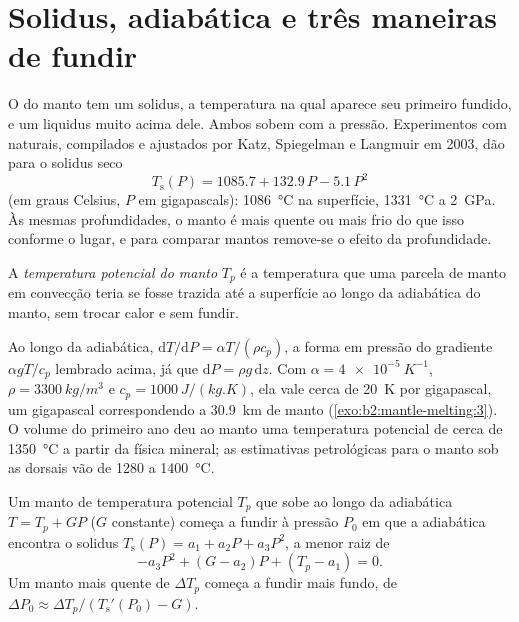 \section{Solidus, adiabática e três maneiras de fundir}\label{sec:b2:mantle-melting:solidus}

O  do manto tem um solidus, a temperatura na qual aparece seu primeiro fundido,
e um liquidus muito acima dele. Ambos sobem com a pressão. Experimentos com 
naturais, compilados e ajustados por Katz, Spiegelman e Langmuir em 2003, dão
para o solidus seco
\[
  T_{\mathrm{s}}(P) = 1085.7 + 132.9\,P - 5.1\,P^2
\]
(em graus Celsius, $P$ em gigapascals): \qty{1086}{\celsius} na superfície,
\qty{1331}{\celsius} a \qty{2}{GPa}. Às mesmas profundidades, o manto é mais quente ou
mais frio do que isso conforme o lugar, e para comparar mantos remove-se o
efeito da profundidade.

\begin{definition}\label{def:b2:mantle-melting:tp}
A \emph{temperatura potencial do manto} $T_p$
é a temperatura que uma parcela de manto em convecção teria se fosse
trazida até a superfície ao longo da adiabática do manto, sem trocar calor e
sem fundir.
\end{definition}

Ao longo da adiabática, $\mathrm dT/\mathrm dP = \alpha T/(\rho c_p)$, a forma em
pressão do gradiente $\alpha gT/c_p$ lembrado acima, já que $\mathrm dP = \rho
g\,\mathrm dz$. Com $\alpha = \qty{4e-5}{K^{-1}}$, $\rho = \qty{3300}{kg/m^3}$
e $c_p = \qty{1000}{J/(kg.K)}$, ela vale cerca de \qty{20}{K} por gigapascal, um
gigapascal correspondendo a \qty{30.9}{km} de manto (\cref{exo:b2:mantle-melting:3}). O volume do primeiro ano deu
ao manto uma temperatura potencial de cerca de \qty{1350}{\celsius} a partir da física
mineral; as estimativas petrológicas para o manto sob as dorsais vão de 1280 a
\qty{1400}{\celsius}.

\begin{proposition}\label{prop:b2:mantle-melting:onset}
Um manto de temperatura potencial $T_p$ que sobe ao longo da adiabática $T = T_p + GP$ ($G$
constante) começa a fundir à pressão $P_0$ em que a adiabática encontra o
solidus $T_{\mathrm s}(P) = a_1 + a_2P + a_3P^2$, a menor raiz de
\[
  -a_3P^2 + (G - a_2)P + (T_p - a_1) = 0 .
\]
Um manto mais quente de $\Delta T_p$ começa a fundir mais fundo, de $\Delta P_0 \approx
\Delta T_p/(T_{\mathrm s}'(P_0) - G)$.
\end{proposition}

